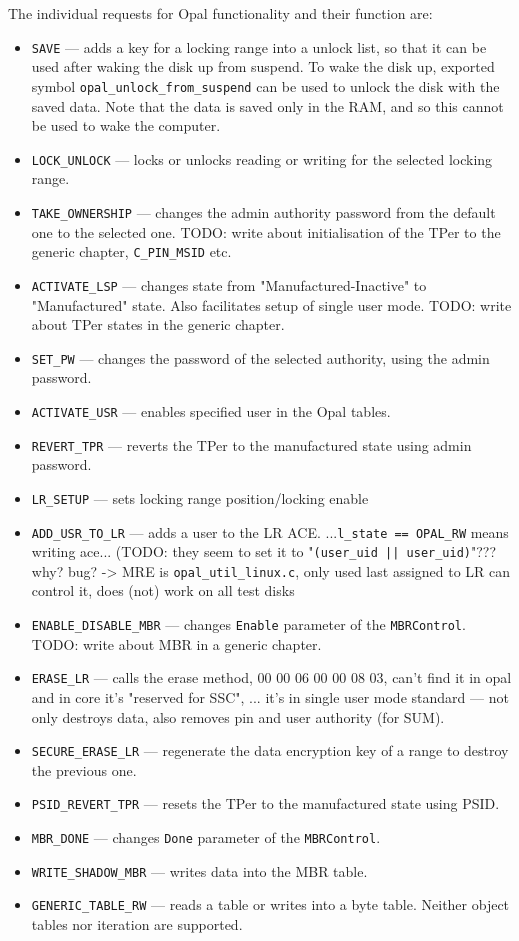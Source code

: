 The individual requests for Opal functionality and their function are:
\begin{itemize}
\item \verb|SAVE| --- adds a key for a locking range into a unlock list, so that it can be used after waking the disk up from suspend. To wake the disk up, exported symbol \verb|opal_unlock_from_suspend| can be used to unlock the disk with the saved data. Note that the data is saved only in the RAM, and so this cannot be used to wake the computer.
\item \verb|LOCK_UNLOCK| --- locks or unlocks reading or writing for the selected locking range.
\item \verb|TAKE_OWNERSHIP| --- changes the admin authority password from the default one to the selected one. TODO: write about initialisation of the TPer to the generic chapter, \verb|C_PIN_MSID| etc.
\item \verb|ACTIVATE_LSP| --- changes state from "Manufactured-Inactive" to "Manufactured" state. Also facilitates setup of single user mode. TODO: write about TPer states in the generic chapter. 
\item \verb|SET_PW| --- changes the password of the selected authority, using the admin password.
\item \verb|ACTIVATE_USR| --- enables specified user in the Opal tables.
\item \verb|REVERT_TPR| --- reverts the TPer to the manufactured state using admin password.
\item \verb|LR_SETUP| --- sets locking range position/locking enable
\item \verb|ADD_USR_TO_LR| --- adds a user to the LR ACE. ...\verb|l_state == OPAL_RW| means writing ace...  (TODO: they seem to set it to "\verb#(user_uid || user_uid)#"??? why? bug? -> MRE is \verb|opal_util_linux.c|, only used last assigned to LR can control it, does (not) work on all test disks
\item \verb|ENABLE_DISABLE_MBR| --- changes \verb|Enable| parameter of the \verb|MBRControl|. TODO: write about MBR in a generic chapter.
\item \verb|ERASE_LR| --- calls the erase method, 00 00 06 00 00 08 03, can't find it in opal and in core it's "reserved for SSC", ... it's in single user mode standard --- not only destroys data, also removes pin and user authority (for SUM).
\item \verb|SECURE_ERASE_LR| --- regenerate the data encryption key of a range to destroy the previous one.
\item \verb|PSID_REVERT_TPR| --- resets the TPer to the manufactured state using PSID.
\item \verb|MBR_DONE| --- changes \verb|Done| parameter of the \verb|MBRControl|.
\item \verb|WRITE_SHADOW_MBR| --- writes data into the MBR table.
\item \verb|GENERIC_TABLE_RW| --- reads a table or writes into a byte table. Neither object tables nor iteration are supported.
\end{itemize}

